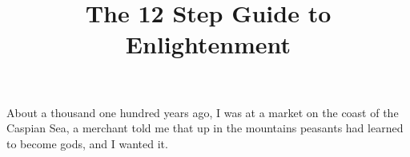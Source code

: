 \title{The 12 Step Guide to Enlightenment}

About a thousand one hundred years ago, I was at a market on the coast of the
Caspian Sea, a merchant told me that up in the mountains peasants had
learned to become gods, and I wanted it. 
